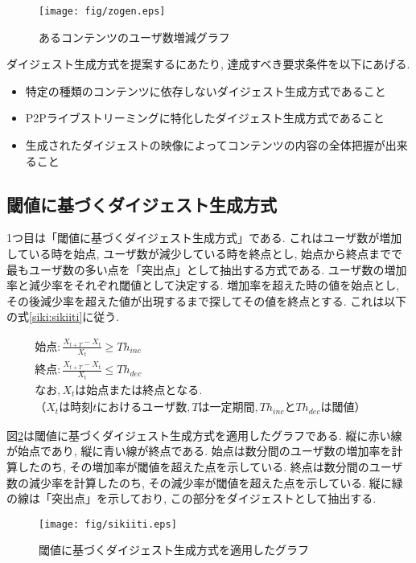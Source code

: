 \begin{figure}[h]
  \centering
  \texttt{[image: fig/zogen.eps]}
  \caption{あるコンテンツのユーザ数増減グラフ}
  \label{fig:zogen}
\end{figure}

ダイジェスト生成方式を提案するにあたり, 達成すべき要求条件を以下にあげる.

\begin{itemize}
\item 特定の種類のコンテンツに依存しないダイジェスト生成方式であること
\item P2Pライブストリーミングに特化したダイジェスト生成方式であること
\item 生成されたダイジェストの映像によってコンテンツの内容の全体把握が出来ること
\end{itemize}

\newpage

\subsection{閾値に基づくダイジェスト生成方式}\label{subsec:pro-sikiiti}
1つ目は「閾値に基づくダイジェスト生成方式」である. これはユーザ数が増加している時を始点, ユーザ数が減少している時を終点とし, 始点から終点までで最もユーザ数の多い点を「突出点」として抽出する方式である. ユーザ数の増加率と減少率をそれぞれ閾値として決定する. 増加率を超えた時の値を始点とし, その後減少率を超えた値が出現するまで探してその値を終点とする.  これは以下の式\ref{siki:sikiiti}に従う.

\begin{eqnarray}
始点: \frac{X_{t+T}-X_{t}}{X_{t}} \geq Th_{inc} \nonumber \\
終点: \frac{X_{t+T}-X_{t}}{X_{t}} \leq Th_{dec} \nonumber \\
なお, X_{t}は始点または終点となる. \nonumber \\
（X_{t}は時刻tにおけるユーザ数,Tは一定期間, Th_{inc}とTh_{dec}は閾値）&&
\label{siki:sikiiti}
\end{eqnarray}


図\ref{fig:sikiiti}は閾値に基づくダイジェスト生成方式を適用したグラフである. 縦に赤い線が始点であり, 縦に青い線が終点である. 始点は数分間のユーザ数の増加率を計算したのち, その増加率が閾値を超えた点を示している. 終点は数分間のユーザ数の減少率を計算したのち, その減少率が閾値を超えた点を示している. 縦に緑の線は「突出点」を示しており, この部分をダイジェストとして抽出する.

\begin{figure}[h]
  \centering
  \texttt{[image: fig/sikiiti.eps]}
  \caption{閾値に基づくダイジェスト生成方式を適用したグラフ}
  \label{fig:sikiiti}
\end{figure}

